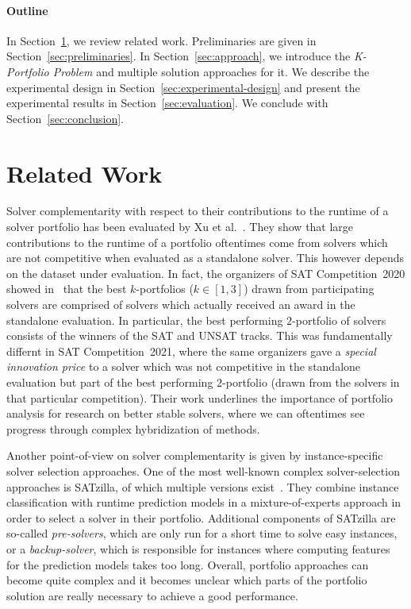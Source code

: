 \documentclass[conference]{IEEEtran}
\begin{document}
\paragraph{Outline}

In Section~\ref{sec:related-work}, we review related work. 
Preliminaries are given in Section~\ref{sec:preliminaries}. 
In Section~\ref{sec:approach}, we introduce the \emph{K-Portfolio Problem} and multiple solution approaches for it. 
We describe the experimental design in Section~\ref{sec:experimental-design} and present the experimental results in Section~\ref{sec:evaluation}. 
We conclude with Section~\ref{sec:conclusion}. 

\section{Related Work}
\label{sec:related-work}

Solver complementarity with respect to their contributions to the runtime of a solver portfolio has been evaluated by Xu et al.~\cite{Xu:2012:EvalContribVBS}. 
They show that large contributions to the runtime of a portfolio oftentimes come from solvers which are not competitive when evaluated as a standalone solver. 
This however depends on the dataset under evaluation. 
In fact, the organizers of SAT Competition~2020 showed in~\cite{SC2020:AIJ} that the best $k$-portfolios ($k \in [1,3]$) drawn from participating solvers are comprised of solvers which actually received an award in the standalone evaluation. 
In particular, the best performing $2$-portfolio of solvers consists of the winners of the SAT and UNSAT tracks. 
This was fundamentally differnt in SAT Competition~2021, where the same organizers gave a \emph{special innovation price} to a solver which was not competitive in the standalone evaluation but part of the best performing $2$-portfolio (drawn from the solvers in that particular competition). 
Their work underlines the importance of portfolio analysis for research on better stable solvers, where we can oftentimes see progress through complex hybridization of methods. 

Another point-of-view on solver complementarity is given by instance-specific solver selection approaches. 
One of the most well-known complex solver-selection approaches is SATzilla, of which multiple versions exist~\cite{xu2008satzilla, xu2012satzilla2012}. 
They combine instance classification with runtime prediction models in a mixture-of-experts approach in order to select a solver in their portfolio. 
Additional components of SATzilla are so-called \emph{pre-solvers}, which are only run for a short time to solve easy instances, or a \emph{backup-solver}, which is responsible for instances where computing features for the prediction models takes too long. 
Overall, portfolio approaches can become quite complex and it becomes unclear which parts of the portfolio solution are really necessary to achieve a good performance.
\end{document}
